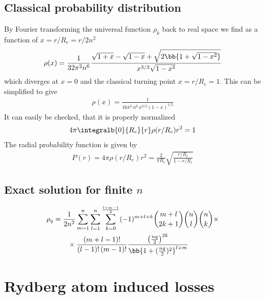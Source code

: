 \subsection{Classical probability distribution}
By Fourier transforming the universal function $\rho_k$ back to real space we find as a function of $x=r/R_e=r/2n^2$
\begin{align}
\rho(x)=\frac{1}{32 \pi ^2 n^6}\frac{\sqrt{1+x}-\sqrt{1-x}+\sqrt{2\bb{1+\sqrt{1-x^2}}}}{ x^{3/2} \sqrt{1-x^2}}
\end{align}
which diverges at $x=0$ and the classical turning point $x=r/R_e=1$. This can be simplified to give
\begin{align}
\rho(x)=\frac{1}{16\pi^2\, n^6 \, x^{3/2} (1-x)^{1/2}}
\end{align}
It can easily be checked, that it is properly normalized
\begin{align}
4\pi \integralb{0}{R_e}{r} \rho(r/R_e) r^2 = 1
\end{align}
The radial probability function is given by
\begin{align}
P(r)=4\pi \rho(r/R_e) r^2 = \frac{2}{\pi R_e} \sqrt{\frac{r/R_e}{1-r/R_e}}
\end{align}



\subsection{Exact solution for finite $n$}
\begin{align}
\rho_q&=\frac{1}{2 n^2}\sum_{m=1}^{n} \sum_{l=1}^{n} \sum_{k=0}^{\frac{l+m-1}{2}} (-1)^{m+l+k}\binom{m+l}{2 k+1}\binom{n}{l}\binom{n}{k} \times\\
&\qquad \times\frac{ (m+l-1)! }{(l-1)!  \,(m-1)!   } \frac{\left(\frac{n q}{2}\right)^{2 k}}{\bb{1+(\frac{n q}{2})^2}^{l+m}}
\end{align}

\section{Rydberg atom induced losses}
